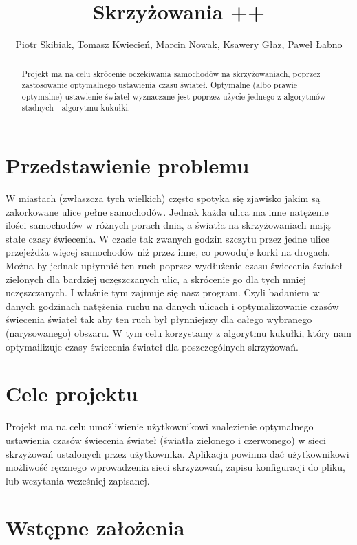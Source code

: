 \documentclass{article}
\title {Skrzyżowania ++}
\author{Piotr Skibiak, Tomasz Kwiecień, Marcin Nowak, Ksawery Głaz, Paweł Łabno}
\institute{AGH, Wydział IEiT, Informatyka}
\begin{document}
\maketitle

\begin{abstract}
Projekt ma na celu skrócenie oczekiwania samochodów na skrzyżowaniach, poprzez zastosowanie optymalnego ustawienia czasu świateł. Optymalne (albo prawie optymalne) ustawienie świateł wyznaczane jest poprzez użycie jednego z algorytmów stadnych - algorytmu kukułki.   
\end{abstract}

\newpage
\renewcommand*\contentsname{Spis Treści}
\tableofcontents
\setcounter{tocdepth}{3}

\newpage

\section{Przedstawienie problemu}
    W miastach (zwłaszcza tych wielkich) często spotyka się zjawisko jakim są zakorkowane ulice pełne samochodów. Jednak każda ulica ma inne natężenie ilości samochodów w różnych porach dnia, a światła na skrzyżowaniach mają stałe czasy świecenia. W czasie tak zwanych godzin szczytu przez jedne ulice przejeżdża więcej samochodów niż przez inne, co powoduje korki na drogach. Można by jednak upłynnić ten ruch poprzez wydłużenie czasu świecenia świateł zielonych dla bardziej uczęszczanych ulic, a skrócenie go dla tych mniej uczęszczanych. I właśnie tym zajmuje się nasz program. Czyli badaniem w danych godzinach natężenia ruchu na danych ulicach i optymalizowanie czasów świecenia świateł tak aby ten ruch był płynniejszy dla całego wybranego (narysowanego) obszaru. W tym celu korzystamy z algorytmu kukułki, który nam optymailizuje czasy świecenia świateł dla poszczególnych skrzyżowań.


\section{Cele projektu}
    Projekt ma na celu umożliwienie użytkownikowi znalezienie optymalnego ustawienia czasów świecenia świateł (światła zielonego i czerwonego) w sieci skrzyżowań ustalonych przez użytkownika. Aplikacja powinna dać użytkownikowi możliwość ręcznego wprowadzenia sieci skrzyżowań, zapisu konfiguracji do pliku, lub wczytania wcześniej zapisanej. 

\section{Wstępne założenia}
\end{document}
